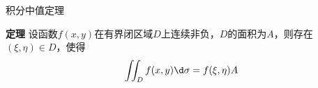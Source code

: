 \begin{frame}{积分中值定理}
	\linespread{1.2}\pause 
	\begin{block}{{\bf 定理}\hfill}
		设函数$f(x,y)$在有界闭区域$D$上连续非负，$D$的面积为$A$，则存在
		$(\xi,\eta)\in D$，使得
		$$\iint_Df(x,y)\d\sigma=f(\xi,\eta)A$$
	\end{block}
	\bigskip\pause 
	\centerline{}
\end{frame}

% 
% 
% 
